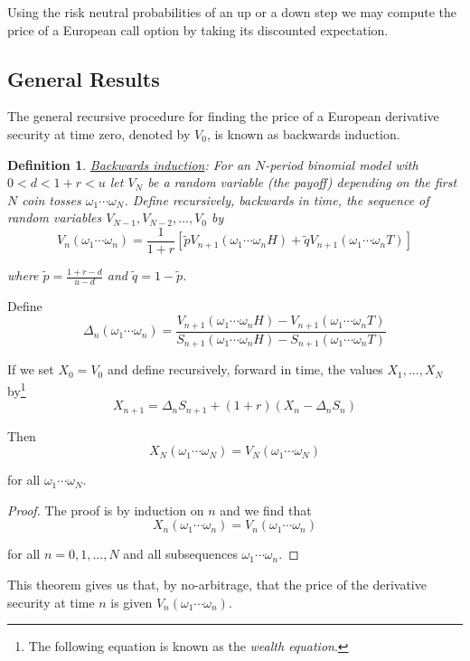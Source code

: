 \documentclass[12pt]{article}
\newenvironment{theorem}[2][Theorem:]{\begin{trivlist} %
\item[\hskip \labelsep {\bfseries #1}\hskip \labelsep {\bfseries #2.}]}{\end{trivlist}}
\newtheorem{definition}{Definition}
\newlength\tindent
\renewcommand{\indent}{\hspace*{\tindent}}
\begin{document}
\indent Using the risk neutral probabilities of an up or a down step we may compute the price of a European call option by taking its discounted expectation.

\subsection{General Results}

\indent The general recursive procedure for finding the price of a European derivative security at time zero, denoted by $V_0$, is known as backwards induction. 

\begin{definition} \underline{Backwards induction}: For an $N$-period binomial model with $0 < d < 1 + r < u$ let $V_N$ be a random variable (the payoff) depending on the first $N$ coin tosses $\omega_1\cdots\omega_N$. Define recursively, backwards in time, the sequence of random variables $V_{N - 1}, V_{N - 2}, ..., V_0$ by
\begin{equation*}
	V_n(\omega_1\cdots\omega_n) = \frac{1}{1 + r}\left[\tilde{p}V_{n + 1}(\omega_1\cdots\omega_n H) + \tilde{q}V_{n + 1}(\omega_1\cdots\omega_n T) \right]
\end{equation*}

where $\tilde{p} = \frac{1 + r - d}{u - d}$ and $\tilde{q} = 1 - \tilde{p}$.
\end{definition}

\begin{theorem}{Replication} Define
\begin{equation*}
	\Delta_n(\omega_1\cdots\omega_n) = \frac{V_{n + 1}(\omega_1\cdots\omega_n H) - V_{n + 1}(\omega_1\cdots\omega_n T)}{S_{n + 1}(\omega_1\cdots\omega_n H) - S_{n + 1}(\omega_1\cdots\omega_n T)}
\end{equation*}

If we set $X_0 = V_0$ and define recursively, forward in time, the values $X_1, ..., X_N$ by\footnote{The following equation is known as the {\em wealth equation}.}
\begin{equation*}
	X_{n + 1} = \Delta_nS_{n + 1} + (1 + r)(X_n - \Delta_n S_n)
\end{equation*}

Then
\begin{equation*}
	X_N(\omega_1\cdots\omega_N) = V_N(\omega_1\cdots\omega_N)
\end{equation*}

for all $\omega_1\cdots\omega_N$.

\begin{proof} The proof is by induction on $n$ and we find that
\begin{equation*}
	X_n(\omega_1\cdots\omega_n) = V_n(\omega_1\cdots\omega_n)
\end{equation*}

for all $n = 0, 1, ..., N$ and all subsequences $\omega_1\cdots\omega_n$.
\end{proof}

\indent This theorem gives us that, by no-arbitrage, that the price of the derivative security at time $n$ is given $V_n(\omega_1\cdots\omega_n)$.
\end{theorem}
\end{document}
